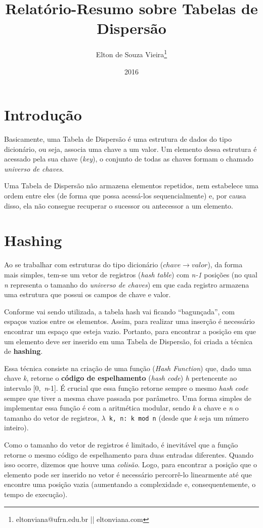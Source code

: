 \documentclass[12pt,openright,oneside,a4paper,english,brazil]{abntex2}
\author{Elton de Souza Vieira\thanks{eltonviana@ufrn.edu.br || eltonviana.com}}
\title{Relatório-Resumo sobre Tabelas de Dispersão}
\date{2016}
\newcommand{\code}[1]{\colorbox{codegray}{\texttt{#1}}}
\begin{document}
\imprimircapa

\section*{Introdução}
    Basicamente, uma Tabela de Dispersão é uma estrutura de dados do tipo dicionário, ou seja, associa uma chave a um valor.
    Um elemento dessa estrutura é acessado pela sua chave (\textit{key}), o conjunto de todas as chaves formam o chamado \textit{universo de chaves}.

    Uma Tabela de Dispersão não armazena elementos repetidos, nem estabelece uma ordem entre eles (de forma que possa acessá-los sequencialmente) e, por causa disso, ela não consegue recuperar o sucessor ou antecessor a um elemento.

\section*{Hashing}
    Ao se trabalhar com estruturas do tipo dicionário (${chave}\rightarrow{valor}$), da forma mais simples, tem-se um vetor de registros (\textit{hash table}) com \textit{n-1} posições (no qual \textit{n} representa o tamanho do \textit{universo de chaves}) em que cada registro armazena uma estrutura que possui os campos de chave e valor.

    Conforme vai sendo utilizada, a tabela hash vai ficando ``bagunçada'', com espaços vazios entre os elementos. Assim, para realizar uma inserção é necessário encontrar um espaço que esteja vazio.
    Portanto, para encontrar a posição em que um elemento deve ser inserido em uma Tabela de Dispersão, foi criada a técnica de \textbf{hashing}.

    Essa técnica consiste na criação de uma função (\textit{Hash Function}) que, dado uma chave \textit{k}, retorne o \textbf{código de espelhamento} (\textit{hash code}) \textit{h} pertencente ao intervalo [0,~\textit{n}-1].
    É crucial que essa função retorne sempre o mesmo \textit{hash code} sempre que tiver a mesma chave passada por parâmetro.
    Uma forma simples de implementar essa função é com a aritmética modular, sendo \textit{k} a chave e \textit{n} o tamanho do vetor de registros, \code{$\lambda$~k,~n:~k~mod~n} (desde que \textit{k} seja um número inteiro).

    Como o tamanho do vetor de registros é limitado, é inevitável que a função retorne o mesmo código de espelhamento para duas entradas diferentes.
    Quando isso ocorre, dizemos que houve uma \textit{colisão}.
    Logo, para encontrar a posição que o elemento pode ser inserido no vetor é necessário percorrê-lo linearmente até que encontre uma posição vazia (aumentando a complexidade e, consequentemente, o tempo de execução).
\end{document}
